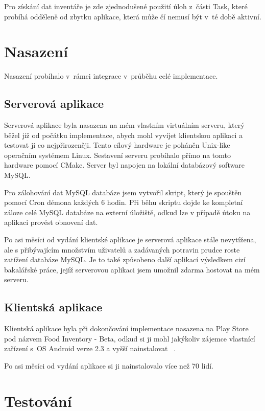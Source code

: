 \documentclass[thesis=B,czech]{FITthesis}[2013/10/20]
\begin{document}
Pro získání dat inventáře je zde zjednodušené použití úloh z~části Task, které probíhá odděleně od zbytku aplikace, která může čí nemusí být v~té době aktivní.

\chapter{Nasazení}

Nasazení probíhalo v~rámci integrace v~průběhu celé implementace.

\section{Serverová aplikace}

Serverová aplikace byla nasazena na mém vlastním virtuálním serveru, který běžel již od počátku implementace, abych mohl vyvíjet klientskou aplikaci a testovat ji co nejpřirozeněji. Tento cílový hardware je poháněn Unix-like operačním systémem Linux. Sestavení serveru probíhalo přímo na tomto hardware pomocí CMake. Server byl napojen na lokální databázový software MySQL. 

Pro zálohování dat MySQL databáze jsem vytvořil skript, který je spouštěn pomocí Cron démona každých 6 hodin. Při běhu skriptu dojde ke kompletní záloze celé MySQL databáze na externí úložiště, odkud lze v případě útoku na aplikaci provést obnovení dat.

Po asi měsíci od vydání klientské aplikace je serverová aplikace stále nevytížena, ale s přibývajícím množstvím uživatelů a zadávaných potravin prudce roste zatížení databáze MySQL. Je to také způsobeno další aplikací výsledkem cizí bakalářské práce, jejíž serverovou aplikaci jsem umožnil zdarma hostovat na mém serveru.

\section{Klientská aplikace}

Klientská aplikace byla při dokončování implementace nasazena na Play Store pod názvem Food Inventory - Beta, odkud si ji mohl jakýkoliv zájemce vlastnící zařízení s~OS Android verze 2.3 a vyšší nainstalovat ~\cite{food_inventory_playstore}.

Po asi měsíci od vydání aplikace si ji nainstalovalo více než 70 lidí.

\chapter{Testování}
\end{document}
